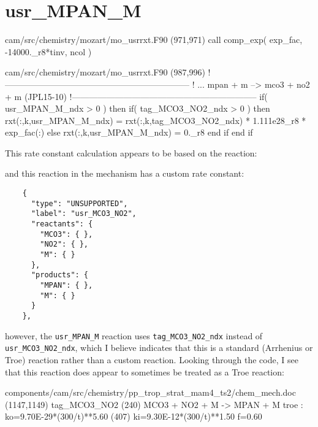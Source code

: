 \documentclass[titlepage]{article}
\begin{document}

\section{usr\_MPAN\_M}

\begin{blockcode}[commandchars=\\\{\}]
\color{gray}cam/src/chemistry/mozart/mo_usrrxt.F90 (971,971)
       call comp_exp( exp_fac, -14000._r8*tinv, ncol )
\end{blockcode}
\begin{blockcode}[commandchars=\\\{\}]
\color{gray}cam/src/chemistry/mozart/mo_usrrxt.F90 (987,996)
!-----------------------------------------------------------------
! ... mpan + m --> mco3 + no2 + m (JPL15-10)
!-----------------------------------------------------------------
       if( usr_MPAN_M_ndx > 0 ) then
          if( tag_MCO3_NO2_ndx > 0 ) then
             rxt(:,k,usr_MPAN_M_ndx) = rxt(:,k,tag_MCO3_NO2_ndx) * 1.111e28_r8 * exp_fac(:)
          else
             rxt(:,k,usr_MPAN_M_ndx) = 0._r8
          end if
       end if
\end{blockcode}

This rate constant calculation appears to be based on the reaction:
\vspace{20px}


\vspace{20px}
\noindent and this reaction in the mechanism has a custom rate constant:

\begin{verbatim}
    {
      "type": "UNSUPPORTED",
      "label": "usr_MCO3_NO2",
      "reactants": {
        "MCO3": { },
        "NO2": { },
        "M": { }
      },
      "products": {
        "MPAN": { },
        "M": { }
      }
    },
\end{verbatim}

\noindent however, the \verb>usr_MPAN_M> reaction uses \verb>tag_MCO3_NO2_ndx> instead of \verb>usr_MCO3_NO2_ndx>, which I believe indicates that this is a standard (Arrhenius or Troe) reaction rather than a custom reaction. Looking through the code, I see that this reaction does appear to sometimes be treated as a Troe reaction:

\begin{blockcode}[commandchars=\\\{\}]
\color{gray}components/cam/src/chemistry/pp_trop_strat_mam4_ts2/chem_mech.doc (1147,1149)
  tag_MCO3_NO2     (240)   MCO3 + NO2 + M ->  MPAN + M                                          troe : ko=9.70E-29*(300/t)**5.60  (407)
                                                                                                       ki=9.30E-12*(300/t)**1.50
                                                                                                        f=0.60
\end{blockcode}
\end{document}
